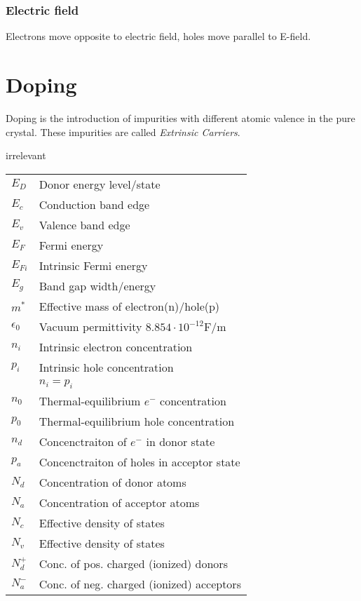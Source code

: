 \documentclass[a4paper, fontsize=8pt, landscape, DIV=1]{scrartcl}
\newcommand{\makeultracompact}{irrelevant}
\begin{document}
\begin{multicols*}{4}
  \subsubsection{Electric field}
  Electrons move opposite to electric field, holes move parallel to E-field.

  \section{Doping}
  Doping is the introduction of impurities with different atomic valence in the pure crystal. These impurities are called \textit{Extrinsic Carriers}.


  \ifdefined\makeultracompact
  \else
  \begin{tabular}[h]{l l}
    $E_D$   & Donor energy level/state \\
    $E_c$   & Conduction band edge\\
    $E_v$   & Valence band edge\\
    $E_F$   & Fermi energy\\
    $E_{Fi}$   & Intrinsic Fermi energy\\
    $E_g$   & Band gap width/energy\\
    $m^*$   & Effective mass of electron(n)/hole(p) \\
    $\epsilon_0$ & Vacuum permittivity $8.854\cdot 10^{-12}$F/m\\
    $n_i$   & Intrinsic electron concentration \\
    $p_i$   & Intrinsic hole concentration\\
    {}      & $n_i=p_i$\\
    $n_0$   & Thermal-equilibrium $e^-$ concentration\\
    $p_0$   & Thermal-equilibrium hole concentration\\
    $n_d$   & Concenctraiton of $e^-$ in donor state \\
    $p_a$   & Concenctraiton of holes in acceptor state \\
    $N_d$   & Concentration of donor atoms\\
    $N_a$   & Concentration of acceptor atoms\\
    $N_c$   & Effective density of states\\
    $N_v$   & Effective density of states\\
    $N_d^+$   & Conc. of pos. charged (ionized) donors \\
    $N_a^-$   & Conc. of neg. charged (ionized) acceptors \\
  \end{tabular}
  \fi


\end{multicols*}
\end{document}
